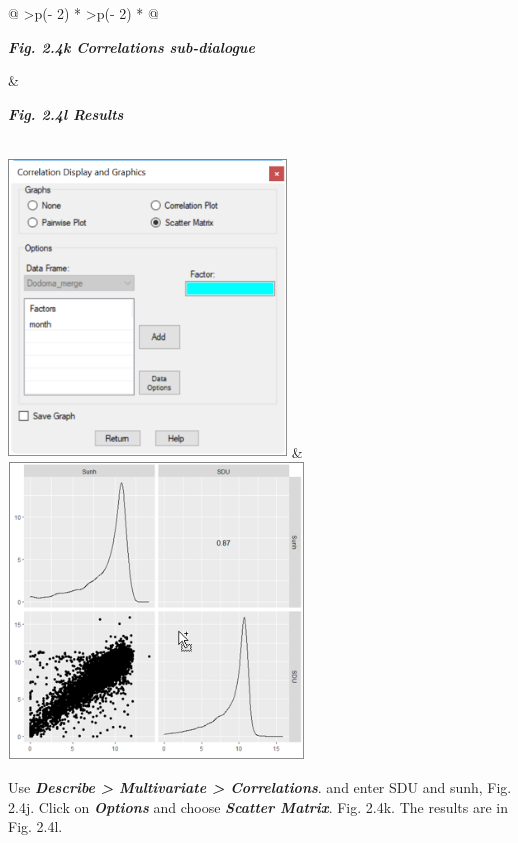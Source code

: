 \documentclass[
  letterpaper,
  DIV=11,
  numbers=noendperiod]{scrreprt}
\begin{document}
\begin{longtable}[]{@{}
  >{\centering\arraybackslash}p{(\columnwidth - 2\tabcolsep) * }
  >{\centering\arraybackslash}p{(\columnwidth - 2\tabcolsep) * }@{}}
\toprule\noalign{}
\begin{minipage}[b]{\linewidth}\centering
\textbf{\emph{Fig. 2.4k Correlations sub-dialogue}}
\end{minipage} & \begin{minipage}[b]{\linewidth}\centering
\textbf{\emph{Fig. 2.4l Results}}
\end{minipage} \\
\midrule\noalign{}
\endhead
\bottomrule\noalign{}
\endlastfoot
\includegraphics[width=2.906in,height=3.124in]{figures/Fig2.4k.png} &
\includegraphics[width=3.094in,height=3.094in]{figures/Fig2.4l.png} \\
\end{longtable}

Use \textbf{\emph{Describe \textgreater{} Multivariate \textgreater{}
Correlations}}. and enter SDU and sunh, Fig. 2.4j. Click on
\textbf{\emph{Options}} and choose \textbf{\emph{Scatter Matrix}}. Fig.
2.4k. The results are in Fig. 2.4l.
\end{document}
